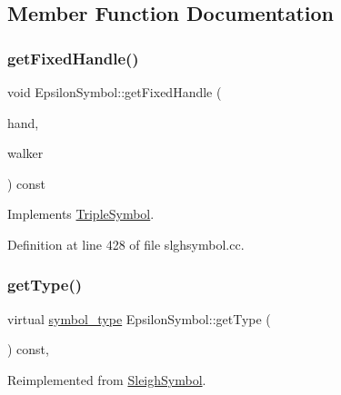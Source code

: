 \subsection{Member Function Documentation}
\mbox{\label{class_epsilon_symbol_ae75ba4c46f54f5ee391f0a4ec8dd3933}} 
\subsubsection{\texorpdfstring{getFixedHandle()}{getFixedHandle()}}
{\footnotesize\ttfamily void Epsilon\+Symbol\+::get\+Fixed\+Handle (\begin{DoxyParamCaption}\item[{\mbox{\hyperlink{struct_fixed_handle}{Fixed\+Handle}} \&}]{hand,  }\item[{\mbox{\hyperlink{class_parser_walker}{Parser\+Walker}} \&}]{walker }\end{DoxyParamCaption}) const\hspace{0.3cm}{\ttfamily [virtual]}}



Implements \mbox{\hyperlink{class_triple_symbol_aa71f48c79a2bee73e97fdfb8163b4e46}{Triple\+Symbol}}.



Definition at line 428 of file slghsymbol.\+cc.

\mbox{\label{class_epsilon_symbol_adeb5f05c9e5550f3a35a223f826e1fd7}} 
\subsubsection{\texorpdfstring{getType()}{getType()}}
{\footnotesize\ttfamily virtual \mbox{\hyperlink{class_sleigh_symbol_aba70f7f332fd63488c5ec4bd7807db41}{symbol\+\_\+type}} Epsilon\+Symbol\+::get\+Type (\begin{DoxyParamCaption}\item[{void}]{ }\end{DoxyParamCaption}) const\hspace{0.3cm}{\ttfamily [inline]}, {\ttfamily [virtual]}}



Reimplemented from \mbox{\hyperlink{class_sleigh_symbol_a2f6e5903e461084c29f95ea024883950}{Sleigh\+Symbol}}.




